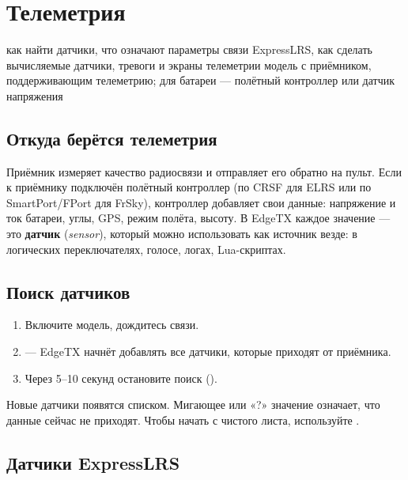 \chapter{Телеметрия}
\label{ch:telemetry}
\chapterintro
  {как найти датчики, что означают параметры связи ExpressLRS, как сделать вычисляемые
   датчики, тревоги и экраны телеметрии}
  {модель с приёмником, поддерживающим телеметрию; для батареи --- полётный контроллер или
   датчик напряжения}

\section{Откуда берётся телеметрия}

Приёмник измеряет качество радиосвязи и отправляет его обратно на пульт. Если к приёмнику
подключён полётный контроллер (по CRSF для ELRS или по SmartPort/FPort для FrSky), контроллер
добавляет свои данные: напряжение и ток батареи, углы, GPS, режим полёта, высоту.
В EdgeTX каждое значение --- это \textbf{датчик} (\emph{sensor}), который можно использовать
как источник везде: в логических переключателях, голосе, логах, Lua-скриптах.

\section{Поиск датчиков}

\begin{enumerate}
  \item Включите модель, дождитесь связи.
  \item {} --- EdgeTX начнёт добавлять
        все датчики, которые приходят от приёмника.
  \item Через 5--10 секунд остановите поиск ().
\end{enumerate}

Новые датчики появятся списком. Мигающее или «?» значение означает, что данные сейчас
не приходят. Чтобы начать с чистого листа, используйте .

\section{Датчики ExpressLRS}

